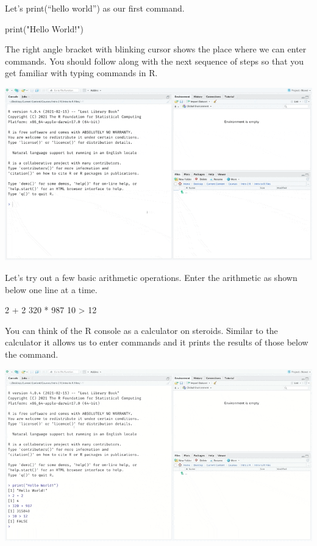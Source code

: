 \documentclass[
]{book}
\newenvironment{Shaded}{\begin{snugshade}}{\end{snugshade}}
\newcommand{\DecValTok}[1]{\textcolor[rgb]{0.00,0.00,0.81}{#1}}
\newcommand{\FunctionTok}[1]{\textcolor[rgb]{0.00,0.00,0.00}{#1}}
\newcommand{\NormalTok}[1]{#1}
\newcommand{\SpecialCharTok}[1]{\textcolor[rgb]{0.00,0.00,0.00}{#1}}
\newcommand{\StringTok}[1]{\textcolor[rgb]{0.31,0.60,0.02}{#1}}
\begin{document}
Let's print(``hello world'') as our first command.

\begin{Shaded}
\begin{Highlighting}[]
\FunctionTok{print}\NormalTok{(}\StringTok{"Hello World!"}\NormalTok{)}
\end{Highlighting}
\end{Shaded}

The right angle bracket with blinking cursor shows the place where we can enter commands. You should follow along with the next sequence of steps so that you get familiar with typing commands in R.

\includegraphics{assets/ch_1-setup/gifs/hello_world.gif}

Let's try out a few basic arithmetic operations. Enter the arithmetic as shown below one line at a time.

\begin{Shaded}
\begin{Highlighting}[]
\DecValTok{2} \SpecialCharTok{+} \DecValTok{2}
\DecValTok{320} \SpecialCharTok{*} \DecValTok{987}
\DecValTok{10} \SpecialCharTok{\textgreater{}} \DecValTok{12}
\end{Highlighting}
\end{Shaded}

You can think of the R console as a calculator on steroids. Similar to the calculator it allows us to enter commands and it prints the results of those below the command.

\includegraphics{assets/ch_1-setup/gifs/console.gif}
\end{document}
